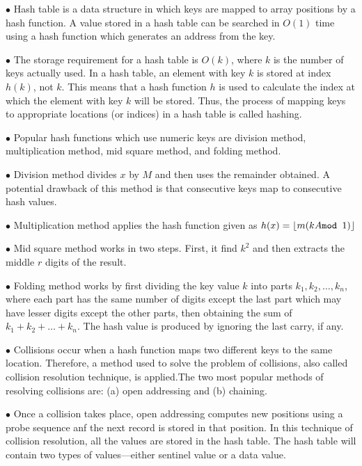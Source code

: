 \vskip 3mm
\qquad$\bullet$ Hash table is a data structure in which keys are mapped to array positions by a hash function. A value stored in a hash table can be searched in $O(1)$ time using a hash function which generates an address from the key.

\vskip 3mm
\qquad$\bullet$ The storage requirement for a hash table is $O(k)$, where $k$ is the number of keys actually used. In a hash table, an element with key $k$ is stored at index $h(k)$, not $k$. This means that a hash function $h$ is used to calculate the index at which the element with key $k$ will be stored. Thus, the process of mapping keys to appropriate locations (or indices) in a hash table is called hashing.

\vskip 3mm
\qquad$\bullet$ Popular hash functions which use numeric keys are division method, multiplication method, mid square method, and folding method.

\vskip 3mm
\qquad$\bullet$ Division method divides $x$ by $M$ and then uses the remainder obtained. A potential drawback of this method is that consecutive keys map to consecutive hash values.

\vskip 3mm
\qquad$\bullet$ Multiplication method applies the hash function given as $h(x)=\lfloor m(kA\hbox{\tt mod } 1)\rfloor$

\vskip 3mm
\qquad$\bullet$ Mid square method works in two steps. First, it find $k^2$ and then extracts the middle $r$ digits of the result.

\vskip 3mm
\qquad$\bullet$ Folding method works by first dividing the key value $k$ into parts $k_1, k_2, \ldots, k_n$, where each part has the same number of digits except the last part which may have lesser digits except the other parts, then obtaining the sum of $k_1+k_2+\ldots+k_n$. The hash value is produced by ignoring the last carry, if any.

\vskip 3mm
\qquad$\bullet$ Collisions occur when a hash function maps two different keys to the same location. Therefore, a method used to solve the problem of collisions, also called collision resolution technique, is applied.The two most popular methods of resolving collisions are: (a) open addressing and (b) chaining.

\vskip 3mm
\qquad$\bullet$ Once a collision takes place, open addressing computes new positions using a probe sequence anf the next record is stored in that position. In this technique of collision resolution, all the values are stored in the hash table. The hash table will contain two types of values---either sentinel value or a data value.

